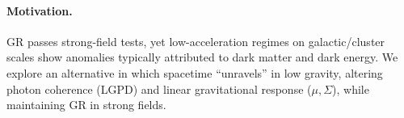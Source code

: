 
\paragraph{Motivation.} GR passes strong-field tests, yet low-acceleration regimes on galactic/cluster scales show anomalies typically attributed to dark matter and dark energy. We explore an alternative in which spacetime ``unravels'' in low gravity, altering photon coherence (LGPD) and linear gravitational response ($\mu,\Sigma$), while maintaining GR in strong fields.
